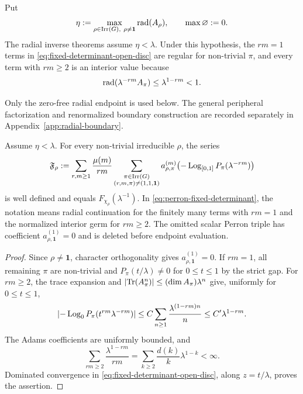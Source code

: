 Put
\begin{equation}\label{eq:strict-gap}
  \eta:=\max_{\rho\in\operatorname{Irr}(G),\ \rho\neq\mathbf1}\operatorname{rad}(A_\rho),
  \qquad \max\varnothing:=0.
\end{equation}
  The radial inverse theorems assume \(\eta<\lambda\).  Under this hypothesis,
the \(rm=1\) terms in \eqref{eq:fixed-determinant-open-disc} are regular for
non-trivial \(\pi\), and every term with \(rm\geq2\) is an interior value
because
\begin{equation}\label{eq:interior-radius}
  \operatorname{rad}(\lambda^{-rm}A_\pi)\leq\lambda^{1-rm}<1.
\end{equation}

Only the zero-free radial endpoint is used below.  The general peripheral
factorization and renormalized boundary construction are recorded separately
in Appendix~\ref{app:radial-boundary}.

\begin{lemma}
\label{lem:perron-fixed-coordinate}
Assume \(\eta<\lambda\).  For every non-trivial irreducible \(\rho\), the
series
\begin{equation}\label{eq:perron-fixed-determinant}
  \mathfrak F_\rho:=
  \sum_{r,m\geq1}\frac{\mu(m)}{rm}
    \sum_{\substack{\pi\in\operatorname{Irr}(G)\\(r,m,\pi)\neq(1,1,\mathbf1)}}
       a_{\rho,\pi}^{(m)}
       \bigl(-\operatorname{Log}_{[0,1]}P_\pi(\lambda^{-rm})\bigr)
\end{equation}
is well defined and equals \(F_{\chi_\rho}(\lambda^{-1})\).  In
\eqref{eq:perron-fixed-determinant}, the notation means radial continuation
for the finitely many terms with \(rm=1\) and the normalized interior germ
for \(rm\geq2\).  The omitted scalar Perron triple has coefficient
\(a_{\rho,\mathbf1}^{(1)}=0\) and is deleted before endpoint evaluation.
\end{lemma}

\begin{proof}
Since \(\rho\neq\mathbf1\), character orthogonality gives
\(a_{\rho,\mathbf1}^{(1)}=0\).  If \(rm=1\), all remaining \(\pi\) are
non-trivial and \(P_\pi(t/\lambda)\neq0\) for \(0\leq t\leq1\) by the strict
gap.  For \(rm\geq2\), the trace expansion and
\(\lvert \operatorname{Tr}(A_\pi^n) \rvert\leq(\dim A_\pi)\lambda^n\) give, uniformly for
\(0\leq t\leq1\),
\[
 \lvert -\operatorname{Log}_0P_\pi(t^{rm}\lambda^{-rm}) \rvert
 \leq C\sum_{n\geq1}\frac{\lambda^{(1-rm)n}}n
 \leq C'\lambda^{1-rm}.
\]
The Adams coefficients are uniformly bounded, and
\[
  \sum_{rm\geq2}\frac{\lambda^{1-rm}}{rm}
  =\sum_{k\geq2}\frac{d(k)}k\lambda^{1-k}<\infty.
\]
Dominated convergence in \eqref{eq:fixed-determinant-open-disc}, along
\(z=t/\lambda\), proves the assertion.
\end{proof}
